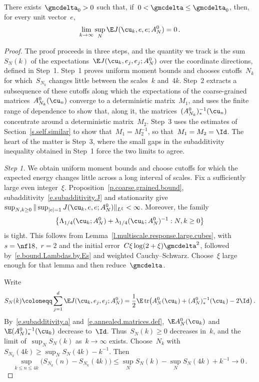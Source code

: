 \documentclass[11pt]{amsart}
\begin{document}
\begin{theorem}
\label{mfd:thm-eta}
There exists~$\gmcdelta_0>0$ such that, if~$0<\gmcdelta\leq\gmcdelta_0$, then, for every unit vector~$e$,
\begin{equation*}
	\lim_{k\to\infty}\sup_N\E J(\cu_k,e,e;A_N^0)=0\,.
\end{equation*}
\end{theorem}
\begin{proof}
The proof proceeds in three steps, and the quantity we track is the sum~$S_N(k)$ of the expectations~$\E J(\cu_k,e_j,e_j;A_N^0)$ over the coordinate directions, defined in Step~1. Step~1 proves uniform moment bounds and chooses cutoffs~$N_k$ for which~$S_{N_k}$ changes little between the scales~$k$ and~$4k$. Step~2 extracts a subsequence of these cutoffs along which the expectations of the coarse-grained matrices~$A_{N_k}^0(\cu_n)$ converge to a deterministic matrix~$M_1$, and uses the finite range of dependence to show that, along it, the matrices~$(A_{N_k}^0)_*^{-1}(\cu_n)$ concentrate around a deterministic matrix~$M_2$. Step~3 uses the estimates of Section~\ref{s.self.similar} to show that~$M_1=M_2^{-1}$, so that~$M_1=M_2=\Id$. The heart of the matter is Step~3, where the small gaps in the subadditivity inequality obtained in Step~1 force the two limits to agree.

\smallskip

\emph{Step 1.} We obtain uniform moment bounds and choose cutoffs for which the expected energy changes little across a long interval of scales. Fix a sufficiently large even integer~$\xi$. Proposition~\ref{p.coarse.grained.bound}, subadditivity~\eqref{e.subadditivity.J} and stationarity give~$\sup_{N,k\geq0}\|\sup_{|e|=1}J(\cu_k,e,e;A_N^0)\|_{L^\xi}<\infty$. Moreover, the family
\begin{equation*}
	\left\{\Lambda_{1/4}(\cu_k;A_N^0)+\lambda_{1/4}(\cu_k;A_N^0)^{-1}:N,k\geq0\right\}
\end{equation*}
is tight. This follows from Lemma~\ref{l.multiscale.response.large.cubes}, with~$s=\nf18$,~$r=2$ and the initial error~$C\xi\log(2+\xi)\gmcdelta^2$, followed by~\eqref{e.bound.Lambdas.by.Es} and weighted Cauchy--Schwarz. Choose~$\xi$ large enough for that lemma and then reduce~$\gmcdelta$.

\smallskip

Write
\begin{equation*}
	S_N(k)\coloneqq\sum_{j=1}^d\E J(\cu_k,e_j,e_j;A_N^0)
	=\frac12\E\operatorname{tr}\bigl(A_N^0(\cu_k)+(A_N^0)_*^{-1}(\cu_k)-2\Id\bigr)\,.
\end{equation*}
By~\eqref{e.subadditivity.a} and~\eqref{e.annealed.matrices.def},~$\E A_N^0(\cu_k)$ and~$\E(A_N^0)_*^{-1}(\cu_k)$ decrease to~$\Id$. Thus~$S_N(k)\geq0$ decreases in~$k$, and the limit of~$\sup_N S_N(k)$ as~$k\to\infty$ exists. Choose~$N_k$ with~$S_{N_k}(4k)\geq\sup_N S_N(4k)-k^{-1}$. Then
\begin{equation*}
	\sup_{k\leq n\leq4k}\bigl(S_{N_k}(n)-S_{N_k}(4k)\bigr)
	\leq\sup_N S_N(k)-\sup_N S_N(4k)+k^{-1}\longrightarrow0\,.
\end{equation*}


\end{proof}
\end{document}
